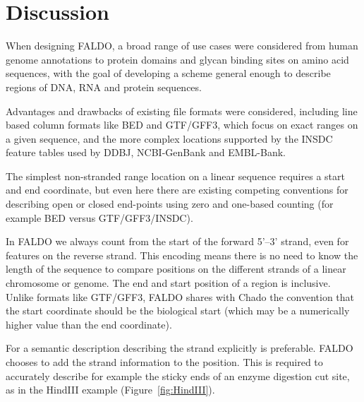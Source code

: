 \section*{Discussion}
When designing FALDO, a broad range of use cases were considered from
human genome annotations to protein domains and glycan binding sites on
amino acid sequences, with the goal of developing a scheme general enough
to describe regions of DNA, RNA and protein sequences.

Advantages and drawbacks of existing file formats were considered, including
line based column formats like BED and GTF/GFF3, which focus on exact
ranges on a given sequence, and the more complex locations supported
by the INSDC feature tables used by DDBJ, NCBI-GenBank and EMBL-Bank.

The simplest non-stranded range location on a linear sequence requires
a start and end coordinate, but even here there are existing competing
conventions for describing open or closed end-points using zero and
one-based counting (for example BED versus GTF/GFF3/INSDC).

In FALDO we always count from the start of the forward 5'--3' strand, even for features on the reverse strand.
This encoding means there is no need to know the length of the sequence to compare positions on the different strands of a linear chromosome or genome.
The end and start position of a region is inclusive.
Unlike formats like GTF/GFF3, FALDO shares with Chado\cite{Chado2007} the convention
that the start coordinate should be the biological start
(which may be a numerically higher value than the end coordinate).



For a semantic description describing the strand explicitly is preferable.
FALDO chooses to add the strand information to the position. 
This is required to accurately describe for example the sticky ends
of an enzyme digestion cut site, as in the HindIII example (Figure~\ref{fig:HindIII}).

